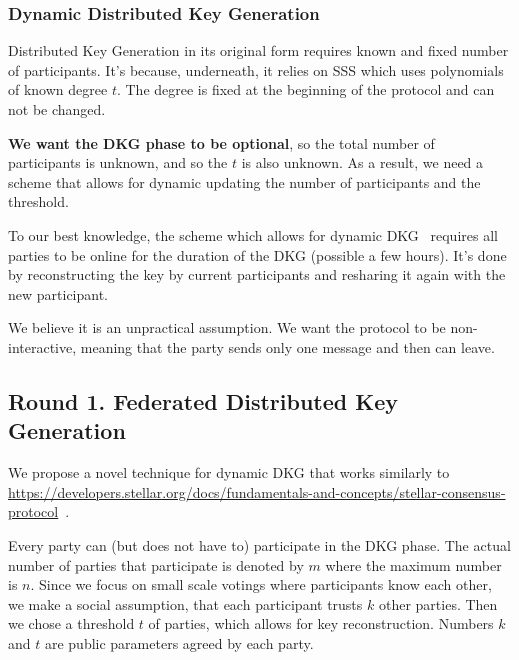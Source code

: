 \documentclass{article}
\begin{document}
\subsubsection*{Dynamic Distributed Key Generation}
Distributed Key Generation in its original form requires known and fixed number of participants. It's because, underneath, it relies on SSS which uses polynomials of known degree $t$. The degree is fixed at the beginning of the protocol and can not be changed.

\textbf{We want the DKG phase to be optional}, so the total number of participants is unknown, and so the $t$ is also unknown. As a result, we need a scheme that allows for dynamic updating the number of participants and the threshold.

To our best knowledge, the scheme which allows for dynamic DKG~\cite{delerableeDynamicThresholdPublickey2008} requires all parties to be online for the duration of the DKG (possible a few hours). It's done by reconstructing the key by current participants and resharing it again with the new participant.

We believe it is an unpractical assumption. We want the protocol to be non-interactive, meaning that the party sends only one message and then can leave.



\subsection{Round 1. Federated Distributed Key Generation}

We propose a novel technique for dynamic DKG that works similarly to \href{Stellar Consensus Protocol}{https://developers.stellar.org/docs/fundamentals-and-concepts/stellar-consensus-protocol}~\cite{mazieresStellarConsensusProtocol2015}.

Every party can (but does not have to) participate in the DKG phase. The actual number of parties that participate is denoted by $m$ where the maximum number is $n$. Since we focus on small scale votings where participants know each other, we make a social assumption, that each participant trusts $k$ other parties. Then we chose a threshold $t$ of parties, which allows for key reconstruction. Numbers $k$ and $t$ are public parameters agreed by each party.
\end{document}
